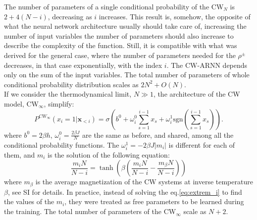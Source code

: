 \documentclass[aps,physrev,10pt,floatfix,reprint]{revtex4-2}
\begin{document}
The number of parameters of a single conditional probability of the CW$_N$ is $2+4(N-i)$, decreasing as $i$ increases. This result is, somehow, the opposite of what the neural network architecture usually should take care of, increasing the number of input variables the number of parameters should also increase to describe the complexity of the function. Still, it is compatible with what was derived for the general case, where the number of parameters needed for the $\rho^{\pm}$ decreases, in that case exponentially, with the index $i$. The CW-ARNN depends only on the sum of the input variables.
The total number of parameters of whole conditional probability distribution scales as $2N^2+ O(N)$. \\
If we consider the thermodynamical limit, $N \gg 1$, the architecture of the CW model, CW$_{\infty}$, simplify:
\begin{equation*}
    P^{CW_{\infty}}\left(x_{i}=1|\mathbf{x}_{<i}\right) =  \sigma \left(b^0+\omega_{i}^0\sum_{s=1}^{i-1}x_{s} + \omega_i^1 \text{sgn}(\sum_{s=1}^{i-1}x_{s})\right).
\end{equation*}
where $b^0=2\beta h$, $\omega^0_i = \frac{2\beta J}{N}$ are the same as before, and shared, among all the conditional probability functions. The $\omega^1_i = -2\beta J |m_i|$ is different for each of them, and $m_i$ is the solution of the following equation:
\begin{equation}
    \frac{m_i N}{N-i} = \tanh \left( \beta(\frac{m_i N}{N - i} - \frac{m_{\beta}N}{N-i}) \right)
    \label{eq:extrem_i}
    \end{equation}
where $m_{\beta}$ is the average magnetization of the CW systems at inverse temperature $\beta$, see SI for details. In practice, instead of solving the eq.\ref{eq:extrem_i} to find the values of the $m_i$, they were treated as free parameters to be learned during the training. The total number of parameters of the CW$_{\infty}$ scale as $N+2$.
    
\end{document}
